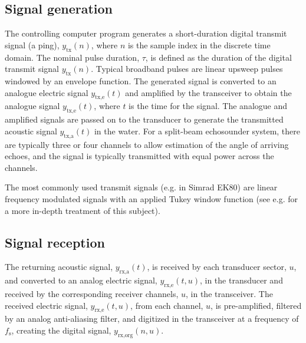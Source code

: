 \documentclass[preprint,12pt,TurnOnLineNumbers]{JASAnew}
\newcommand{\timesym}{t}
\newcommand{\samplesymt}{n}
\newcommand{\channelsym}{u}
\newcommand{\fs}{f_{\textrm{s}}}
\newcommand{\tnom}{\tau}
\newcommand{\ytxe}{y_{\textrm{tx,e}}}
\newcommand{\ytxa}{y_{\textrm{tx,a}}}
\newcommand{\yrxa}{y_{\textrm{rx,a}}}
\newcommand{\yrxe}{y_{\textrm{rx,e}}}
\newcommand{\ytx}{y_{\textrm{tx}}}
\newcommand{\yrxorg}{y_{\textrm{rx,org}}}
\begin{document}
\subsection{Signal generation}

The controlling computer program generates a short-duration digital transmit signal (a ping), $\ytx(\samplesymt)$, where $\samplesymt$ is the sample index in the discrete time domain. The nominal pulse duration, $\tnom$, is defined as the duration of the digital transmit signal $\ytx(\samplesymt)$.
Typical broadband pulses are linear upsweep pulses windowed by an envelope function. The generated signal is converted to an analogue electric signal $\ytxe(\timesym)$ and amplified by the transceiver to obtain the analogue signal $\ytxe(\timesym)$, where $\timesym$ is the time for the signal. The analogue and amplified signals are passed on to the transducer to generate the transmitted acoustic signal $\ytxa(\timesym)$ in the water. For a split-beam echosounder system, there are typically three or four channels to allow estimation of the angle of arriving echoes, and the signal is typically transmitted with equal power across the channels.

The most commonly used transmit signals (e.g. in Simrad EK80) are linear frequency modulated signals with an applied Tukey window function (see e.g. \citet{lavery2017} for a more in-depth treatment of this subject). 

\subsection{Signal reception}

The returning acoustic signal, $\yrxa(\timesym)$, is received by each transducer sector, $\channelsym$, and converted to an analog electric signal, $\yrxe(\timesym,\channelsym)$, in the transducer and received by the corresponding receiver channels, $\channelsym$, in the transceiver. The received electric signal, $\yrxe(\timesym,\channelsym)$, from each channel, $\channelsym$, is pre-amplified, filtered by an analog anti-aliasing filter, and digitized in the transceiver at a frequency of $\fs$, creating the digital signal, $\yrxorg(\samplesymt,\channelsym)$.
\end{document}
